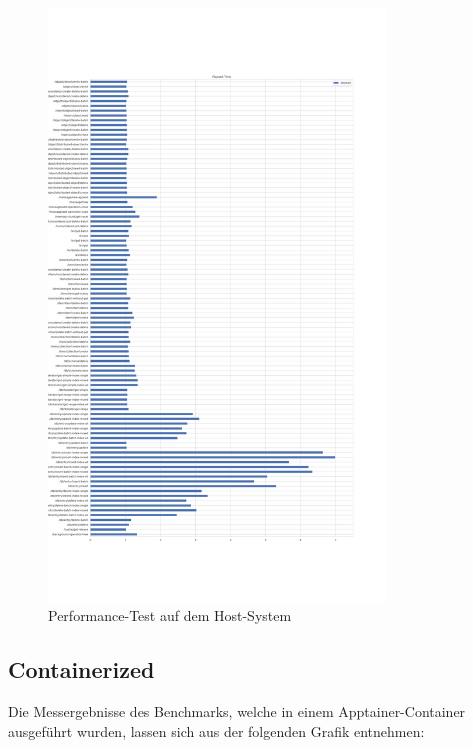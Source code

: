 \begin{figure}[!h]
    \centering
    \includegraphics[width=0.8\textwidth]{benchmark/vis/system/elapsed.png}
    \caption{Performance-Test auf dem Host-System}
    \label{fig:native}
\end{figure}
\FloatBarrier

\subsection{Containerized}

Die Messergebnisse des Benchmarks, welche in einem Apptainer-Container ausgeführt wurden, lassen sich aus der folgenden Grafik entnehmen:

